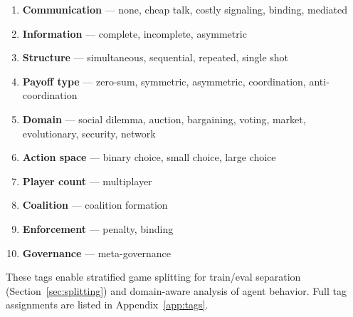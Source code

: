 \begin{enumerate}[nosep]
    \item \textbf{Communication} --- none, cheap talk, costly signaling, binding, mediated
    \item \textbf{Information} --- complete, incomplete, asymmetric
    \item \textbf{Structure} --- simultaneous, sequential, repeated, single shot
    \item \textbf{Payoff type} --- zero-sum, symmetric, asymmetric, coordination, anti-coordination
    \item \textbf{Domain} --- social dilemma, auction, bargaining, voting, market, evolutionary, security, network
    \item \textbf{Action space} --- binary choice, small choice, large choice
    \item \textbf{Player count} --- multiplayer
    \item \textbf{Coalition} --- coalition formation
    \item \textbf{Enforcement} --- penalty, binding
    \item \textbf{Governance} --- meta-governance
\end{enumerate}

These tags enable stratified game splitting for train/eval separation
(Section~\ref{sec:splitting}) and domain-aware analysis of agent behavior.
Full tag assignments are listed in Appendix~\ref{app:tags}.
